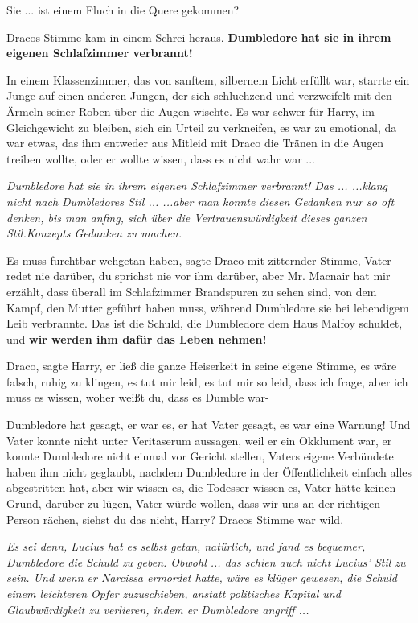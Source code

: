 \glqq{}Sie ... ist einem Fluch in die Quere gekommen?\grqq{}

Dracos Stimme kam in einem Schrei heraus. \glqq{}\textbf{Dumbledore hat sie in
ihrem eigenen Schlafzimmer verbrannt!}\grqq{}

In einem Klassenzimmer, das von sanftem, silbernem Licht erfüllt war, starrte
ein Junge auf einen anderen Jungen, der sich schluchzend und verzweifelt mit den
Ärmeln seiner Roben über die Augen wischte. Es war schwer für Harry, im
Gleichgewicht zu bleiben, sich ein Urteil zu verkneifen, es war zu emotional, da
war etwas, das ihm entweder aus Mitleid mit Draco die Tränen in die Augen
treiben wollte, oder er wollte wissen, dass es nicht wahr war ...

\emph{Dumbledore hat sie in ihrem eigenen Schlafzimmer verbrannt! Das ...
...klang nicht nach Dumbledores Stil ... ...aber man konnte diesen Gedanken nur
so oft denken, bis man anfing, sich über die Vertrauenswürdigkeit dieses ganzen
\glqq{}Stil\grqq{}.Konzepts Gedanken zu machen.}

\glqq{}Es muss furchtbar wehgetan haben\grqq{}, sagte Draco mit zitternder
Stimme, \glqq{}Vater redet nie darüber, du sprichst nie vor ihm darüber, aber Mr.
Macnair hat mir erzählt, dass überall im Schlafzimmer Brandspuren zu sehen sind,
von dem Kampf, den Mutter geführt haben muss, während Dumbledore sie bei
lebendigem Leib verbrannte. Das ist die Schuld, die Dumbledore dem Haus Malfoy
schuldet, und \textbf{wir werden ihm dafür das Leben nehmen!}\grqq{}

\glqq{}Draco\grqq{}, sagte Harry, er ließ die ganze Heiserkeit in seine eigene
Stimme, es wäre falsch, ruhig zu klingen, \glqq{}es tut mir leid, es tut mir so
leid, dass ich frage, aber ich muss es wissen, woher weißt du, dass es Dumble
war-\grqq{}

\glqq{}Dumbledore hat gesagt, er war es, er hat Vater gesagt, es war eine
Warnung! Und Vater konnte nicht unter Veritaserum aussagen, weil er ein
Okklument war, er konnte Dumbledore nicht einmal vor Gericht stellen, Vaters
eigene Verbündete haben ihm nicht geglaubt, nachdem Dumbledore in der
Öffentlichkeit einfach alles abgestritten hat, aber wir wissen es, die Todesser
wissen es, Vater hätte keinen Grund, darüber zu lügen, Vater würde wollen, dass
wir uns an der richtigen Person rächen, siehst du das nicht, Harry?\grqq{}
Dracos Stimme war wild.

\emph{Es sei denn, Lucius hat es selbst getan, natürlich, und fand es bequemer,
Dumbledore die Schuld zu geben. Obwohl ... das schien auch nicht Lucius' Stil zu
sein. Und wenn er Narcissa ermordet hatte, wäre es klüger gewesen, die Schuld
einem leichteren Opfer zuzuschieben, anstatt politisches Kapital und
Glaubwürdigkeit zu verlieren, indem er Dumbledore angriff ...}

